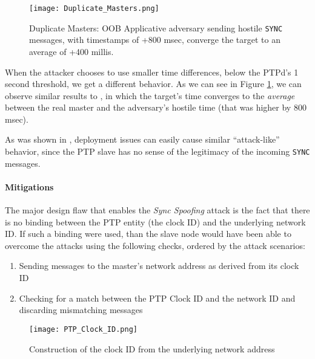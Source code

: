 \documentclass[11pt]{article}
\begin{document}
\begin{figure}[t]

\centerline{\texttt{[image: Duplicate\_Masters.png]}}

\caption{Duplicate Masters: OOB Applicative adversary sending hostile \texttt{SYNC} messages, with timestamps of +800 msec, converge the target to an average of +400 millis.}

\label{Dup Masters}

\end{figure}



When the attacker chooses to use smaller time differences, below the PTPd's 1 second threshold, we get a different behavior. As we can see in Figure \ref{Dup Masters}, we can observe similar results to \cite{Delay}, in which the target's time converges to the \emph{average} between the real master and the adversary's hostile time (that was higher by 800 msec).



As was shown in \cite{first_deploy}, deployment issues can easily cause similar ``attack-like'' behavior, since the PTP slave has no sense of the legitimacy of the incoming \texttt{SYNC} messages.



\paragraph{Mitigations}\label{time:scenrio2mit}

The major design flaw that enables the \emph{Sync Spoofing} attack is the fact that there is no binding between the PTP entity (the clock ID) and the underlying network ID. If such a binding were used, than the slave node would have been able to overcome the attacks using the following checks, ordered by the attack scenarios:

\begin{enumerate}

  \item Sending messages to the master's network address as derived from its clock ID

  \item Checking for a match between the PTP Clock ID and the network ID and discarding mismatching messages

\end{enumerate}



\begin{figure}[t]

\centerline{\texttt{[image: PTP\_Clock\_ID.png]}}

\caption{Construction of the clock ID from the underlying network address}

\label{clock ID}

\end{figure}
\end{document}

